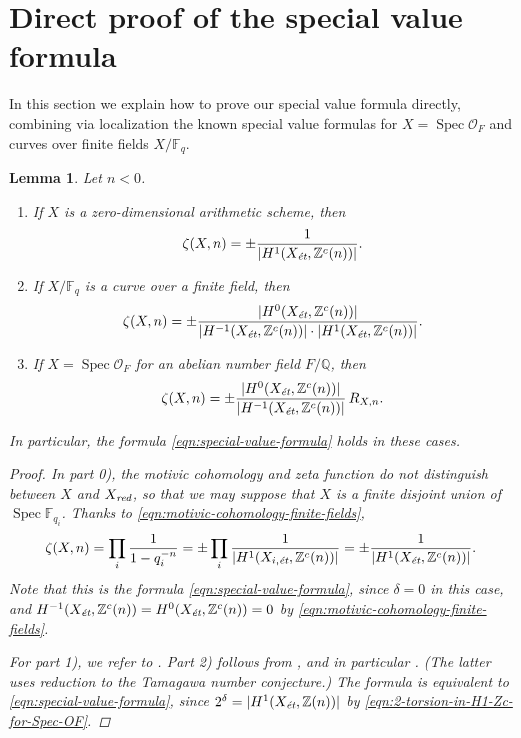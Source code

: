 \documentclass[draft]{article}
\DeclareMathOperator{\Spec}{Spec}
\newcommand{\FF}{\mathbb{F}}
\newcommand{\QQ}{\mathbb{Q}}
\newcommand{\ZZ}{\mathbb{Z}}
\newcommand{\et}{\text{\it \'{e}t}}
\newcommand{\red}{\text{\it red}}
\theoremstyle{myplain}
\newtheorem{lemma}[theorem]{Lemma}
\theoremstyle{mydefinition}
\numberwithin{equation}{section}
\begin{document}

\section{Direct proof of the special value formula}
\label{sec:direct-proof}

In this section we explain how to prove our special value formula directly,
combining via localization the known special value formulas for
$X = \Spec \mathcal{O}_F$ and curves over finite fields $X/\FF_q$.

\begin{lemma}
  \label{lemma:elementary-proof-1}
  Let $n < 0$.

  \begin{enumerate}
  \item[0)] If $X$ is a zero-dimensional arithmetic scheme, then
    $$\zeta (X,n) = \pm \frac{1}{|H^1 (X_\et, \ZZ^c (n))|}.$$

  \item[1)] If $X/\FF_q$ is a curve over a finite field, then
    \[ \zeta (X,n) =
      \pm\frac{|H^0 (X_\et, \ZZ^c(n))|}{|H^{-1} (X_\et, \ZZ^c(n))|\cdot |H^1 (X_\et, \ZZ^c(n))|}. \]

  \item[2)] If $X = \Spec \mathcal{O}_F$ for an abelian number field $F/\QQ$,
    then
    \[ \zeta (X,n) = \pm\frac{|H^0 (X_\et, \ZZ^c(n))|}{|H^{-1} (X_\et, \ZZ^c(n))|}\,R_{X,n}. \]
  \end{enumerate}

  In particular, the formula \eqref{eqn:special-value-formula} holds in these
  cases.

  \begin{proof}
    In part 0), the motivic cohomology and zeta function do not distinguish
    between $X$ and $X_\red$, so that we may suppose that $X$ is a finite
    disjoint union of $\Spec \FF_{q_i}$. Thanks to
    \eqref{eqn:motivic-cohomology-finite-fields},
    \[ \zeta (X,n) = \prod_i \frac{1}{1 - q_i^{-n}} =
      \pm \prod_i \frac{1}{|H^1 (X_{i,\et}, \ZZ^c (n))|} =
      \pm \frac{1}{|H^1 (X_\et, \ZZ^c (n))|}. \]
    Note that this is the formula \eqref{eqn:special-value-formula},
    since $\delta = 0$ in this case, and
    $H^{-1} (X_\et, \ZZ^c (n)) = H^0 (X_\et, \ZZ^c (n)) = 0$ by
    \eqref{eqn:motivic-cohomology-finite-fields}.

    \vspace{1em}

    For part 1), we refer to \cite[\S 5]{Beshenov-Weil-etale-2}.
    Part 2) follows from \cite[\S 5.8.3]{Flach-Morin-2018}, and in particular
    \cite[Proposition~5.35]{Flach-Morin-2018}.
    (The latter uses reduction to the Tamagawa number conjecture.)
    The formula is equivalent to \eqref{eqn:special-value-formula}, since
    $2^\delta = |H^1 (X_\et, \ZZ (n))|$ by
    \eqref{eqn:2-torsion-in-H1-Zc-for-Spec-OF}.
  \end{proof}
\end{lemma}
\end{document}
